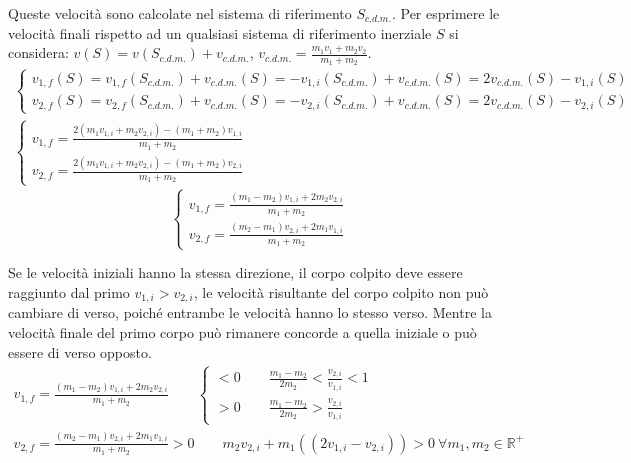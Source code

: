 \documentclass{article}
\numberwithin{equation}{subsection}
\begin{document}
Queste velocità sono calcolate nel sistema di riferimento $S_{c.d.m.}$. Per esprimere le velocità finali rispetto ad un qualsiasi sistema di riferimento inerziale 
$S$ si considera: $v(S)=v(S_{c.d.m.})+v_{c.d.m.}$, $v_{c.d.m.}=\displaystyle\frac{m_1v_1+m_2v_2}{m_1+m_2}$. 
\begin{gather*}
    \begin{cases}
        v_{1,f}(S)=v_{1,f}(S_{c.d.m.})+v_{c.d.m.}(S)=-v_{1,i}(S_{c.d.m.})+v_{c.d.m.}(S)=2v_{c.d.m.}(S)-v_{1,i}(S)\\
        v_{2,f}(S)=v_{2,f}(S_{c.d.m.})+v_{c.d.m.}(S)=-v_{2,i}(S_{c.d.m.})+v_{c.d.m.}(S)=2v_{c.d.m.}(S)-v_{2,i}(S)
    \end{cases}\\
    \begin{cases}
        v_{1,f}=\displaystyle\frac{2(m_1v_{1,i}+m_2v_{2,i})-(m_1+m_2)v_{1,i}}{m_1+m_2}\\
        v_{2,f}=\displaystyle\frac{2(m_1v_{1,i}+m_2v_{2,i})-(m_1+m_2)v_{2,i}}{m_1+m_2}
    \end{cases}
\end{gather*}
\begin{equation}
    \begin{cases}
        v_{1,f}=\displaystyle\frac{(m_1-m_2)v_{1,i}+2m_2v_{2,i}}{m_1+m_2}\\
        v_{2,f}=\displaystyle\frac{(m_2-m_1)v_{2,i}+2m_1v_{1,i}}{m_1+m_2}
    \end{cases}
\end{equation}


Se le velocità iniziali hanno la stessa direzione, il 
corpo colpito deve essere raggiunto dal primo $v_{1,i}>v_{2,i}$, 
le velocità risultante del corpo colpito non può cambiare di 
verso, poiché entrambe le velocità hanno lo stesso verso. Mentre 
la velocità finale del primo corpo può rimanere concorde a 
quella iniziale o può essere di verso opposto.
\begin{gather*}
    \displaystyle v_{1,f}=\frac{(m_1-m_2)v_{1,i}+2m_2v_{2,i}}{m_1+m_2}\qquad
    \begin{cases}
        <0\qquad\displaystyle\frac{m_1-m_2}{2m_2}<\frac{v_{2,i}}{v_{1,i}}<1\\
        >0\qquad\displaystyle\frac{m_1-m_2}{2m_2}>\frac{v_{2,i}}{v_{1,i}}
    \end{cases}\\
    \displaystyle v_{2,f}=\frac{(m_2-m_1)v_{2,i}+2m_1v_{1,i}}{m_1+m_2}>0 \qquad m_2v_{2,i}+m_1((2v_{1,i}-v_{2,i}))>0\:\forall m_1,m_2\in\mathbb{R}^+
\end{gather*}
\end{document}
